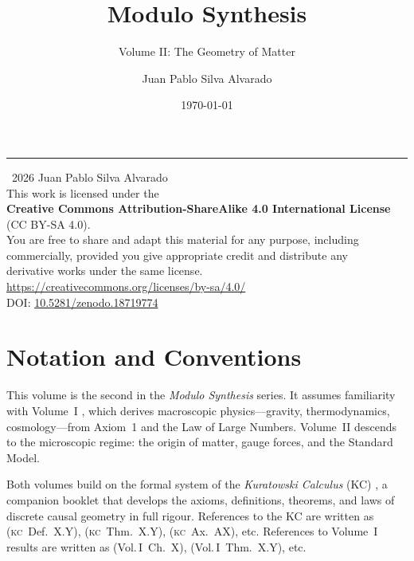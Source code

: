 \documentclass[11pt, a4paper, openany]{book}
\title{Modulo Synthesis}
\subtitle{Volume II: The Geometry of Matter}
\author{Juan Pablo Silva Alvarado}
\date{\today}
\makeatletter
\newcommand{\KC}[1]{\textnormal{(\textsc{kc}~#1)}}
\newcommand{\VolI}[1]{\textnormal{(Vol.\,I~#1)}}
\gdef\@subtitle{}\gdef\@extrainfo{}
\renewcommand{\maketitle}{%
  \begin{titlepage}\centering
    \vspace*{4cm}
    {\Huge\bfseries\color{structure}\@title\par}\vspace{0.6cm}
    \ifx\@subtitle\empty\else{\Large\color{gray!80}\@subtitle\par}\fi
    \vspace{2cm}
    {\color{main}\rule{0.6\textwidth}{2pt}\par}\vspace{2cm}
    {\LARGE\@author\par}\vspace{1cm}
    {\large\@date\par}\vfill
    \ifx\@extrainfo\empty\else
      \begin{minipage}{0.8\textwidth}\centering\itshape\color{gray!60}\@extrainfo\end{minipage}\vspace{3cm}
    \fi
  \end{titlepage}
}
\makeatother
\begin{document}
\maketitle

\thispagestyle{empty}
\vspace*{\fill}
\begin{center}
\textcopyright\ 2026 Juan Pablo Silva Alvarado\\[1em]
This work is licensed under the\\[4pt]
{\bfseries Creative Commons Attribution-ShareAlike 4.0 International License}\\[4pt]
(CC BY-SA 4.0).\\[1em]
You are free to share and adapt this material for any purpose, including\\
commercially, provided you give appropriate credit and distribute any\\
derivative works under the same license.\\[1em]
\url{https://creativecommons.org/licenses/by-sa/4.0/}\\[2em]
{\small DOI: \href{https://doi.org/10.5281/zenodo.18719774}{10.5281/zenodo.18719774}}
\end{center}
\vspace*{\fill}
\clearpage

\frontmatter
\tableofcontents

\chapter*{Notation and Conventions}

This volume is the second in the \textit{Modulo Synthesis} series. It assumes familiarity with Volume~I \cite{silva2025v1}, which derives macroscopic physics---gravity, thermodynamics, cosmology---from Axiom~1 and the Law of Large Numbers. Volume~II descends to the microscopic regime: the origin of matter, gauge forces, and the Standard Model.

Both volumes build on the formal system of the \textit{Kuratowski Calculus} (KC) \cite{silva2025kc}, a companion booklet that develops the axioms, definitions, theorems, and laws of discrete causal geometry in full rigour. References to the KC are written as \KC{Def.~X.Y}, \KC{Thm.~X.Y}, \KC{Ax.~AX}, etc. References to Volume~I results are written as \VolI{Ch.~X}, \VolI{Thm.~X.Y}, etc.
\end{document}
